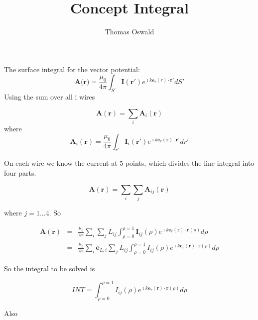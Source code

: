 \documentclass[a4paper,10pt]{report}
\title{Concept Integral}
\author{Thomas Oswald}
\begin{document}




The surface integral for the vector potential:
\begin{equation}
    \mathbf{A}(\mathbf{r)}=\frac{\mu_0}{4 \pi} \int_{S'} \mathbf{I}(\mathbf{r'}) e^{\imath k \mathbf{e}_r(r) \cdot \mathbf{r}'} dS'
\end{equation}
Using the sum over all i wires

\begin{equation}
    \mathbf{A}(\mathbf{r})=\sum_i \mathbf{A}_i(\mathbf{r})
\end{equation}
where
\begin{equation}
    \mathbf{A}_i(\mathbf{r})=\frac{\mu_0}{4 \pi} \int_{r'} \mathbf{I}_i (\mathbf{r'}) e^{\imath k \mathbf{e}_r(\mathbf{r}) \cdot \mathbf{r}'} dr'
\end{equation}

On each wire we know the current at 5 points, which divides the line integral into four parts.

\begin{equation}
    \mathbf{A}(\mathbf{r})=\sum_i \sum_j \mathbf{A}_{ij}(\mathbf{r})
\end{equation}

where $j=1...4$. So

\begin{eqnarray}
    \mathbf{A}(\mathbf{r})&=&\frac{\mu_0 }{4 \pi} \sum_i \sum_j L_{ij}\int_{\rho=0}^{\rho=1} \mathbf{I}_{ij}(\rho) e^{\imath k \mathbf{e}_r(\mathbf{r}) \cdot \mathbf{r}(\rho)} d\rho\\
&=&  \frac{\mu_0 }{4 \pi} \sum_i \mathbf{e}_{L,i} \sum_j L_{ij} \int_{\rho=0}^{\rho=1} I_{ij}(\rho) e^{\imath k \mathbf{e}_r(\mathbf{r}) \cdot \mathbf{r}(\rho)} d\rho \nonumber
\end{eqnarray}

So the integral to be solved is

\begin{equation}\label{integral}
    INT= \int_{\rho=0}^{\rho=1} I_{ij}(\rho) e^{\imath k \mathbf{e}_r(\mathbf{r}) \cdot \mathbf{r}(\rho)} d\rho
\end{equation}

Also
\end{document}
